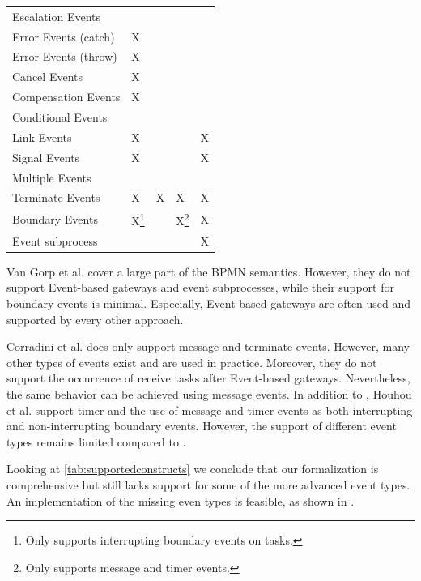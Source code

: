 \documentclass[adraft, copyright, creativecommons]{eptcs} %
\begin{document}
\begin{table}[htbp]
\begin{tabular}{l l l l l}
      Escalation Events & & & & \\
      Error Events (catch) & X & & &\\
      Error Events (throw) & X & & &\\
      Cancel Events & X & & &\\
      Compensation Events & X & & &\\
      Conditional Events & & & &\\
      Link Events & X & & & X\\
      Signal Events & X & & & X\\
      Multiple Events &  & & & \\
      Terminate Events & X & X & X & X\\
     Boundary Events & X\footnote{Only supports interrupting boundary events on tasks.} & & X\footnote{Only supports message and timer events.} & X\\ %
      Event subprocess &  &  &  & X\\
    \end{tabular}
\end{table}

Van Gorp et al. \cite{vangorpVisualTokenbasedFormalization2013} cover a large part of the BPMN semantics.
However, they do not support Event-based gateways and event subprocesses, while their support for boundary events is minimal.
Especially, Event-based gateways are often used and supported by every other approach.

Corradini et al. \cite{corradiniFormalApproachAnalysis2021} does only support message and terminate events.
However, many other types of events exist and are used in practice.
Moreover, they do not support the occurrence of receive tasks after Event-based gateways.
Nevertheless, the same behavior can be achieved using message events.
In addition to \cite{corradiniFormalApproachAnalysis2021}, Houhou et al. \cite{houhouFirstOrderLogicVerification2022} support timer and the use of message and timer events as both interrupting and non-interrupting boundary events.
However, the support of different event types remains limited compared to \cite{vangorpVisualTokenbasedFormalization2013}.

Looking at \cref{tab:supportedconstructs} we conclude that our formalization is comprehensive but still lacks support for some of the more advanced event types.
An implementation of the missing even types is feasible, as shown in \cite{vangorpVisualTokenbasedFormalization2013}.
\end{document}
